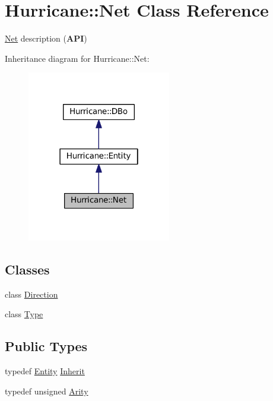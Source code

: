 \hypertarget{classHurricane_1_1Net}{}\section{Hurricane\+:\+:Net Class Reference}
\label{classHurricane_1_1Net}


\mbox{\hyperlink{classHurricane_1_1Net}{Net}} description ({\bfseries A\+PI})  




Inheritance diagram for Hurricane\+:\+:Net\+:\nopagebreak
\begin{figure}[H]
\begin{center}
\leavevmode
\includegraphics[width=178pt]{classHurricane_1_1Net__inherit__graph}
\end{center}
\end{figure}
\subsection*{Classes}
\begin{DoxyCompactItemize}
\item 
class \mbox{\hyperlink{classHurricane_1_1Net_1_1Direction}{Direction}}
\item 
class \mbox{\hyperlink{classHurricane_1_1Net_1_1Type}{Type}}
\end{DoxyCompactItemize}
\subsection*{Public Types}
\begin{DoxyCompactItemize}
\item 
typedef \mbox{\hyperlink{classHurricane_1_1Entity}{Entity}} \mbox{\hyperlink{classHurricane_1_1Net_a3f1ac0fcb03638b2ffa9af6a9a58de15}{Inherit}}
\item 
typedef unsigned \mbox{\hyperlink{classHurricane_1_1Net_a3a242d929e0c733f90f3f69be8cc427b}{Arity}}
\end{DoxyCompactItemize}
